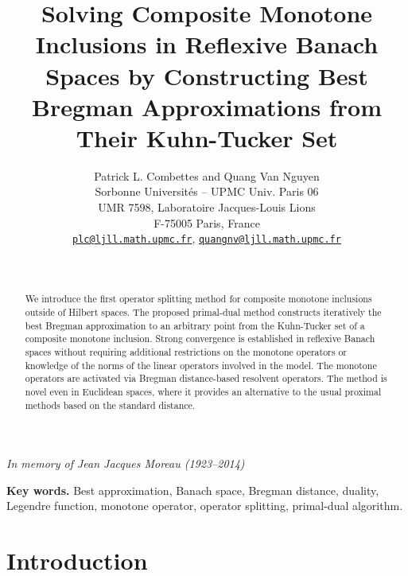 \documentclass[a4paper,11pt,fleqn]{article}
\newcommand{\email}[1]{\href{mailto:#1}{\nolinkurl{#1}}}
\theoremstyle{plain}{\theorembodyfont{\rmfamily}%
\newtheorem{conjecture}[theorem]{Conjecture}}
\theoremstyle{plain}{\theorembodyfont{\rmfamily}%
\newtheorem{example}[theorem]{Example}}
\theoremstyle{plain}{\theorembodyfont{\rmfamily}%
\newtheorem{remark}[theorem]{Remark}}
\theoremstyle{plain}{\theorembodyfont{\rmfamily}%
\newtheorem{algorithm}[theorem]{Algorithm}}
\theoremstyle{plain}{\theorembodyfont{\rmfamily}%
\newtheorem{condition}[theorem]{Condition}}
\theoremstyle{plain}{\theorembodyfont{\rmfamily}%
\newtheorem{definition}[theorem]{Definition}}
\theoremstyle{plain}{\theorembodyfont{\rmfamily}
\newtheorem{problem}[theorem]{Problem}}
\theoremstyle{plain}{\theorembodyfont{\rmfamily}
\newtheorem{notation}[theorem]{Notation}}
\numberwithin{equation}{section}
\begin{document}
\title{\sffamily\LARGE Solving Composite Monotone Inclusions in
Reflexive Banach Spaces by Constructing Best Bregman Approximations
from Their Kuhn-Tucker Set}

\author{Patrick L. Combettes and Quang Van Nguyen\\[5mm]
\small
\small Sorbonne Universit\'es -- UPMC Univ. Paris 06\\
\small UMR 7598, Laboratoire Jacques-Louis Lions\\
\small F-75005 Paris, France\\
\small \email{plc@ljll.math.upmc.fr},\: 
\email{quangnv@ljll.math.upmc.fr}
}
\date{~}

\maketitle
\setcounter{page}{1}

\vskip 8mm

\centerline{\large\em In memory of Jean Jacques Moreau
(1923--2014)}

\begin{abstract}
We introduce the first operator splitting method for composite 
monotone inclusions outside of Hilbert spaces. The proposed 
primal-dual method constructs iteratively the best Bregman 
approximation to an arbitrary point from the Kuhn-Tucker set 
of a composite monotone inclusion. 
Strong convergence is established in reflexive
Banach spaces without requiring additional restrictions on the
monotone operators or knowledge of the norms of the linear
operators involved in the model. The monotone operators are
activated via Bregman distance-based resolvent operators.
The method is novel even in Euclidean spaces, where it provides 
an alternative to the usual proximal methods based on the 
standard distance. 
\end{abstract}

{\bfseries Key words.}
Best approximation,
Banach space,
Bregman distance,
duality,
Legendre function,
monotone operator,
operator splitting,
primal-dual algorithm.


\newpage
\section{Introduction}
\label{IVsec:I}
\end{document}
